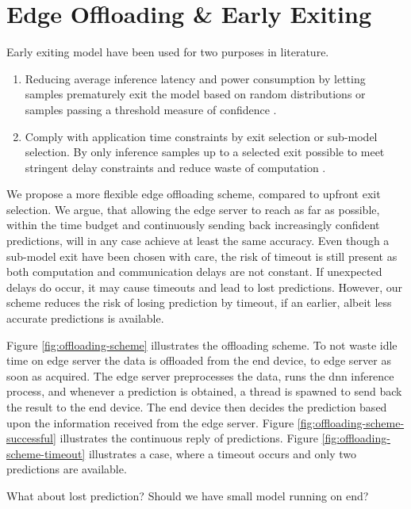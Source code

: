 \chapter{Edge Offloading \& Early Exiting}

Early exiting model have been used for two purposes in literature.

\begin{enumerate}
	\item Reducing average inference latency and power consumption by letting samples prematurely exit the model based on random distributions \cite{bibid} or samples passing a threshold measure of confidence \cite{teerapittayanon_branchynet:_2016}.
	\item Comply with application time constraints by exit selection or sub-model selection. By only inference samples up to a selected exit possible to meet stringent delay constraints and reduce waste of computation \cite{li_edge_2018}. 
\end{enumerate} 

We propose a more flexible edge offloading scheme, compared to upfront exit selection. We argue, that allowing the edge server to reach as far as possible, within the time budget and continuously sending back increasingly confident predictions, will in any case achieve at least the same accuracy. Even though a sub-model exit have been chosen with care, the risk of timeout is still present as both computation and communication delays are not constant. If unexpected delays do occur, it may cause timeouts and lead to lost predictions. However, our scheme reduces the risk of losing prediction by timeout, if an earlier, albeit less accurate predictions is available. 

Figure \ref{fig:offloading-scheme} illustrates the offloading scheme. To not waste idle time on edge server the data is offloaded from the end device, to edge server as soon as acquired. The edge server preprocesses the data, runs the \gls{dnn} inference process, and whenever a prediction is obtained, a thread is spawned to send back the result to the end device. The end device then decides the prediction based upon the information received from the edge server. Figure \ref{fig:offloading-scheme-successful} illustrates the continuous reply of predictions. Figure \ref{fig:offloading-scheme-timeout} illustrates a case, where a timeout occurs and only two predictions are available.

What about lost prediction? Should we have small model running on end?

